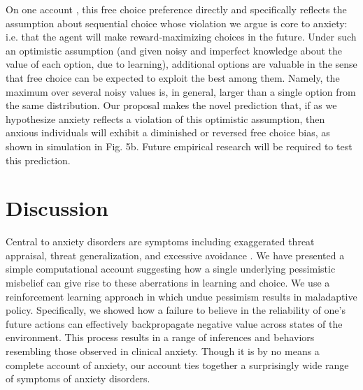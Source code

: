 \documentclass[manuscript]{stjour}
\begin{document}
On one account \citep{ly2019}, this free choice preference directly and specifically reflects the assumption about sequential choice whose violation we argue is core to anxiety: i.e. that the agent will make reward-maximizing choices in the future. Under such an optimistic assumption (and given noisy and imperfect knowledge about the value of each option, due to learning), additional options are valuable in the sense that free choice can be expected to exploit the best among them. Namely, the maximum over several noisy values is, in general, larger than a single option from the same distribution. Our proposal makes the novel prediction that, if as we hypothesize anxiety reflects a violation of this optimistic assumption, then anxious individuals will exhibit a diminished or reversed free choice bias, as shown in simulation in Fig. 5b. Future empirical research will be required to test this prediction.

\section{Discussion}

Central to anxiety disorders are symptoms including exaggerated threat appraisal, threat generalization, and excessive avoidance \citep{ClarkBeck2011, dymond2015, Arnaudova2017}. We have presented a simple computational account suggesting how a single underlying pessimistic misbelief can give rise to these aberrations in learning and choice. We use a reinforcement learning approach in which undue pessimism results in maladaptive policy. Specifically, we showed how a failure to believe in the reliability of one's future actions can effectively backpropagate negative value across states of the environment. This process results in a range of inferences and behaviors resembling those observed in clinical anxiety. Though it is by no means a complete account of anxiety, our account ties together a surprisingly wide range of symptoms of anxiety disorders.
\end{document}
